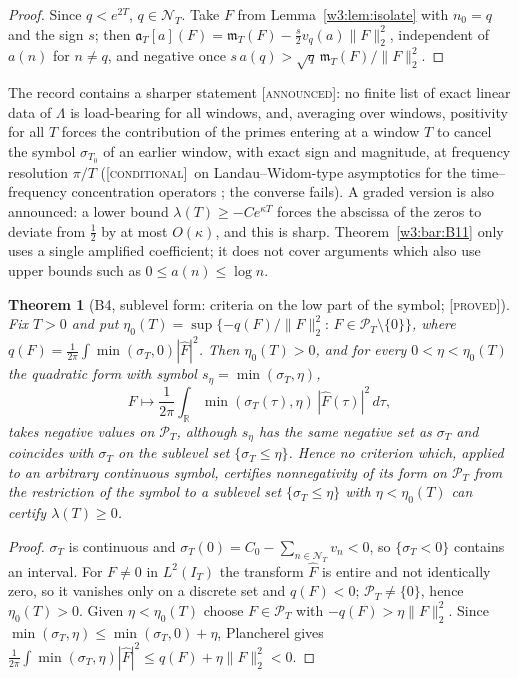 \documentclass[11pt]{amsart}
\newtheorem{theorem}{Theorem}[section]
\theoremstyle{definition}
\theoremstyle{remark}
\numberwithin{equation}{section}
\newcommand{\R}{\mathbb{R}}
\newcommand{\IT}{I_T}                                  %
\newcommand{\Fh}{\widehat F}                           %
\newcommand{\PT}{\mathcal{P}_T}                        %
\newcommand{\NT}{\mathcal{N}_T}                        %
\newcommand{\mT}{\mathfrak{m}_T}                       %
\newcommand{\aT}{\mathfrak{a}_T}                       %
\newcommand{\sT}{\sigma_T}                             %
\newcommand{\lam}{\lambda(T)}                          %
\newcommand{\stag}[1]{\textsc{[#1]}}
\newcommand{\PROVED}{\stag{proved}}
\newcommand{\COND}{\stag{conditional}}
\newcommand{\ANNOUNCED}{\stag{announced}}
\begin{document}
\begin{proof}
Since $q<e^{2T}$, $q\in\NT$. Take $F$ from Lemma~\ref{w3:lem:isolate} with $n_0=q$ and the sign $s$; then
$\aT[a](F)=\mT(F)-\frac s2v_q(a)\|F\|_2^2$, independent of $a(n)$ for $n\ne q$, and negative once
$s\,a(q)>\sqrt q\,\mT(F)/\|F\|_2^2$.
\end{proof}

The record contains a sharper statement \ANNOUNCED: no finite list of exact linear data of $\Lambda$ is
load-bearing for all windows, and, averaging over windows, positivity for all $T$ forces the contribution of
the primes entering at a window $T$ to cancel the symbol $\sigma_{T_0}$ of an earlier window, with exact sign and
magnitude, at frequency resolution $\pi/T$ (\COND\ on Landau--Widom-type asymptotics for the time--frequency
concentration operators \cite{LandauWidom1980}; the converse fails). A graded version is also announced: a
lower bound $\lam\ge-Ce^{\kappa T}$ forces the abscissa of the zeros to deviate from $\frac12$ by at most
$O(\kappa)$, and this is sharp. Theorem~\ref{w3:bar:B11} only uses a single amplified coefficient; it does not
cover arguments which also use upper bounds such as $0\le a(n)\le\log n$.

\begin{theorem}[B4, sublevel form: criteria on the low part of the symbol; \PROVED]\label{w3:bar:B4}
Fix $T>0$ and put $\eta_0(T)=\sup\{-q(F)/\|F\|_2^2:\,F\in\PT\setminus\{0\}\}$, where
$q(F)=\frac1{2\pi}\int\min(\sT,0)|\Fh|^2$. Then $\eta_0(T)>0$, and for every $0<\eta<\eta_0(T)$ the quadratic form
with symbol $s_\eta=\min(\sT,\eta)$,
\[
  F\mapsto\frac1{2\pi}\int_\R\min(\sT(\tau),\eta)\,|\Fh(\tau)|^2\,d\tau ,
\]
takes negative values on $\PT$, although $s_\eta$ has the same negative set as $\sT$ and coincides with $\sT$ on
the sublevel set $\{\sT\le\eta\}$. Hence no criterion which, applied to an arbitrary continuous symbol, certifies nonnegativity of its form on $\PT$ from the restriction of the symbol to a sublevel set $\{\sT\le\eta\}$ with $\eta<\eta_0(T)$ can certify $\lam\ge0$.
\end{theorem}

\begin{proof}
$\sT$ is continuous and $\sT(0)=C_0-\sum_{n\in\NT}v_n<0$, so $\{\sT<0\}$ contains an interval. For $F\ne0$ in
$L^2(\IT)$ the transform $\Fh$ is entire and not identically zero, so it vanishes only on a discrete set and
$q(F)<0$; $\PT\ne\{0\}$, hence $\eta_0(T)>0$. Given $\eta<\eta_0(T)$ choose $F\in\PT$ with
$-q(F)>\eta\|F\|_2^2$. Since $\min(\sT,\eta)\le\min(\sT,0)+\eta$, Plancherel gives
$\frac1{2\pi}\int\min(\sT,\eta)|\Fh|^2\le q(F)+\eta\|F\|_2^2<0$.
\end{proof}
\end{document}
